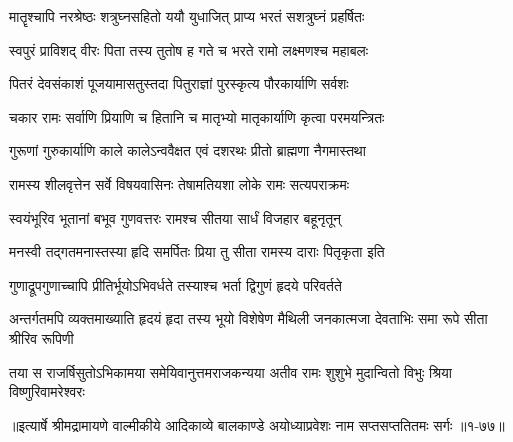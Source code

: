 \twolineshloka
{मातॄश्चापि नरश्रेष्ठः शत्रुघ्नसहितो ययौ}
{युधाजित् प्राप्य भरतं सशत्रुघ्नं प्रहर्षितः} %

\twolineshloka
{स्वपुरं प्राविशद् वीरः पिता तस्य तुतोष ह}
{गते च भरते रामो लक्ष्मणश्च महाबलः} %

\twolineshloka
{पितरं देवसंकाशं पूजयामासतुस्तदा}
{पितुराज्ञां पुरस्कृत्य पौरकार्याणि सर्वशः} %

\twolineshloka
{चकार रामः सर्वाणि प्रियाणि च हितानि च}
{मातृभ्यो मातृकार्याणि कृत्वा परमयन्त्रितः} %

\twolineshloka
{गुरूणां गुरुकार्याणि काले कालेऽन्ववैक्षत}
{एवं दशरथः प्रीतो ब्राह्मणा नैगमास्तथा} %

\twolineshloka
{रामस्य शीलवृत्तेन सर्वे विषयवासिनः}
{तेषामतियशा लोके रामः सत्यपराक्रमः} %

\twolineshloka
{स्वयंभूरिव भूतानां बभूव गुणवत्तरः}
{रामश्च सीतया सार्धं विजहार बहूनृतून्} %

\twolineshloka
{मनस्वी तद्गतमनास्तस्या हृदि समर्पितः}
{प्रिया तु सीता रामस्य दाराः पितृकृता इति} %

\twolineshloka
{गुणाद्रूपगुणाच्चापि प्रीतिर्भूयोऽभिवर्धते}
{तस्याश्च भर्ता द्विगुणं हृदये परिवर्तते} %

\threelineshloka
{अन्तर्गतमपि व्यक्तमाख्याति हृदयं हृदा}
{तस्य भूयो विशेषेण मैथिली जनकात्मजा}
{देवताभिः समा रूपे सीता श्रीरिव रूपिणी} %

\twolineshloka
{तया स राजर्षिसुतोऽभिकामया समेयिवानुत्तमराजकन्यया}
{अतीव रामः शुशुभे मुदान्वितो विभुः श्रिया विष्णुरिवामरेश्वरः} %


॥इत्यार्षे श्रीमद्रामायणे वाल्मीकीये आदिकाव्ये बालकाण्डे अयोध्याप्रवेशः नाम सप्तसप्ततितमः सर्गः ॥१-७७॥
